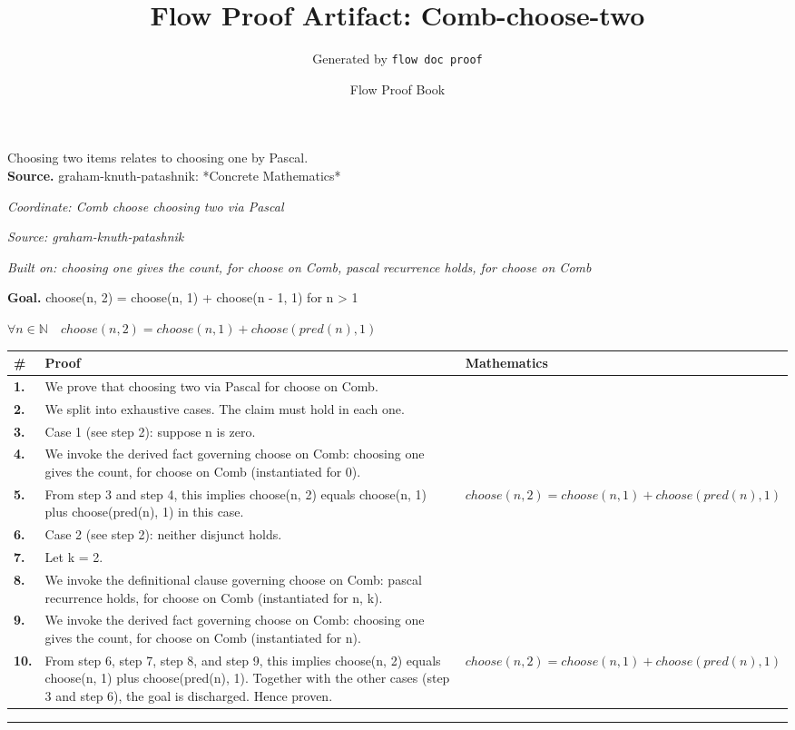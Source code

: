 \documentclass[11pt]{article}
\title{Flow Proof Artifact: Comb-choose-two}
\author{Generated by \texttt{flow doc proof}}
\date{Flow Proof Book}
\theoremstyle{definition}
\begin{document}
\maketitle
Choosing two items relates to choosing one by Pascal.\\[0.5em]
\textbf{Source.} graham-knuth-patashnik: *Concrete Mathematics*\\[0.5em]
\bigskip
{}\par
\smallskip\noindent\textit{Coordinate: Comb \cdot choose \cdot choosing two via Pascal}\par
\smallskip\noindent\textit{Source: graham-knuth-patashnik}\par
\smallskip\noindent\textit{Built on: choosing one gives the count, for choose on Comb, pascal recurrence holds, for choose on Comb}\par
\medskip
\noindent\textbf{Goal.} choose(n, 2) = choose(n, 1) + choose(n - 1, 1) for n > 1\par
\noindent$\displaystyle \forall n \in \mathbb{N}\quad choose(n, 2) = choose(n, 1) + choose(pred(n), 1)$\par
\medskip
\noindent
\begin{tabular}{@{} >{\raggedright\arraybackslash}p{} >{\raggedright\arraybackslash}p{} >{\raggedleft\arraybackslash}p{} @{}}
\textbf{\#} & \textbf{Proof} & \textbf{Mathematics} \\
\midrule
\textbf{1.} & We prove that choosing two via Pascal for choose on Comb. & \\[0.45em]
\textbf{2.} & We split into exhaustive cases. The claim must hold in each one. & \\[0.45em]
\textbf{3.} & Case 1 (see step 2): suppose n is zero. & \\[0.45em]
\textbf{4.} & We invoke the derived fact governing choose on Comb: choosing one gives the count, for choose on Comb (instantiated for 0). & \\[0.45em]
\textbf{5.} & From step 3 and step 4, this implies choose(n, 2) equals choose(n, 1) plus choose(pred(n), 1) in this case. & $\displaystyle choose(n, 2) = choose(n, 1) + choose(pred(n), 1)$ \\[0.45em]
\textbf{6.} & Case 2 (see step 2): neither disjunct holds. & \\[0.45em]
\textbf{7.} & Let k = 2. & \\[0.45em]
\textbf{8.} & We invoke the definitional clause governing choose on Comb: pascal recurrence holds, for choose on Comb (instantiated for n, k). & \\[0.45em]
\textbf{9.} & We invoke the derived fact governing choose on Comb: choosing one gives the count, for choose on Comb (instantiated for n). & \\[0.45em]
\textbf{10.} & From step 6, step 7, step 8, and step 9, this implies choose(n, 2) equals choose(n, 1) plus choose(pred(n), 1). Together with the other cases (step 3 and step 6), the goal is discharged. Hence proven. & $\displaystyle choose(n, 2) = choose(n, 1) + choose(pred(n), 1)$ \\[0.45em]
\bottomrule
\end{tabular}
\label{thm:Comb-choose-choosing_two_via_pascal}
\par\medskip\hrule
\end{document}
